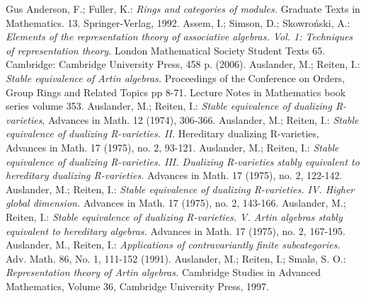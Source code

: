 \documentclass[a4paper]{amsart}
\theoremstyle{definition}
\theoremstyle{remark}
\numberwithin{equation}{theorem}
\begin{document}
\begin{thebibliography}{Gus}
 Anderson, F.; Fuller, K.: {\it Rings and categories of modules.}  Graduate Texts in Mathematics. 13. Springer-Verlag, 1992.
 Assem, I.; Simson, D.; Skowro\'nski, A.: {\it Elements of the representation theory of associative algebras. Vol. 1: Techniques of representation theory. } London Mathematical Society Student Texts 65. Cambridge: Cambridge University Press, 458 p. (2006).
 Auslander, M.; Reiten, I.: {\it Stable equivalence of Artin algebras.} Proceedings of the Conference on Orders, Group Rings and Related Topics pp 8-71. Lecture Notes in Mathematics book series volume 353.
 Auslander, M.; Reiten, I.: {\it Stable equivalence of dualizing R-varieties}, Advances in Math. 12 (1974), 306-366.
 Auslander, M.; Reiten, I.: {\it Stable equivalence of dualizing R-varieties. II.} Hereditary dualizing R-varieties, Advances in Math. 17 (1975), no. 2, 93-121.
 Auslander, M.; Reiten, I.: {\it Stable equivalence of dualizing R-varieties. III. Dualizing R-varieties stably equivalent to hereditary dualizing R-varieties.} Advances in Math. 17 (1975), no. 2, 122-142.
 Auslander, M.; Reiten, I.: {\it Stable equivalence of dualizing R-varieties. IV. Higher global dimension.} Advances in Math. 17 (1975), no. 2, 143-166.
 Auslander, M.; Reiten, I.: {\it Stable equivalence of dualizing R-varieties. V. Artin algebras stably equivalent to hereditary algebras.} Advances in Math. 17 (1975), no. 2, 167-195.
 Auslander, M., Reiten, I.: {\it Applications of contravariantly finite subcategories.} Adv. Math. 86, No. 1, 111-152 (1991).
 Auslander, M.; Reiten, I.; Smal{\o}, S. O.: {\it Representation theory of Artin algebras.} Cambridge Studies in Advanced Mathematics, Volume 36, Cambridge University Press, 1997.


\end{thebibliography}
\end{document}
